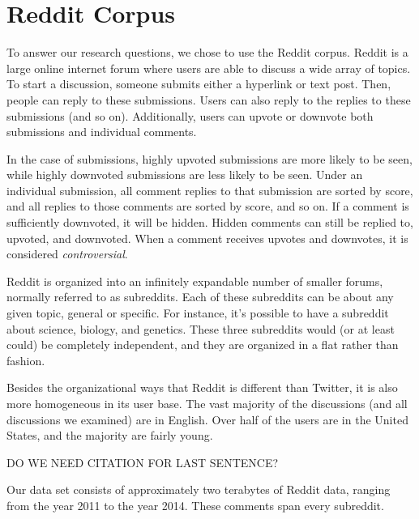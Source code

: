 \section{Reddit Corpus}
To answer our research questions, we chose to use the Reddit corpus. Reddit is a large online internet forum where users are able to discuss a wide array of  topics. To start a discussion, someone submits either a hyperlink or text post. Then, people can reply to these submissions. Users can also reply to the replies to these submissions (and so on). Additionally, users can upvote or downvote both submissions and individual comments. 

In the case of submissions, highly upvoted submissions are more likely to be seen, while highly downvoted submissions are less likely to be seen. Under an individual submission, all comment replies to that submission are sorted by score, and all replies to those comments are sorted by score, and so on. If a comment is sufficiently downvoted, it will be hidden. Hidden comments can still be replied to, upvoted, and downvoted. When a comment receives upvotes and downvotes, it is considered \textit{controversial}.  

Reddit is organized into an infinitely expandable number of smaller forums, normally referred to as subreddits. Each of these subreddits can be about any given topic, general or specific. For instance, it's possible to have a subreddit about science, biology, and genetics. These three subreddits would (or at least could) be completely independent, and they are organized in a flat rather than fashion.

Besides the organizational ways that Reddit is different than Twitter, it is also more homogeneous in its user base. The vast majority of the discussions (and all discussions we examined) are in English. Over half of the users are in the United States, and the majority are fairly young. 

DO WE NEED CITATION FOR LAST SENTENCE?

Our data set consists of approximately two terabytes of Reddit data, ranging from the year 2011 to the year 2014. These comments span every subreddit. 


